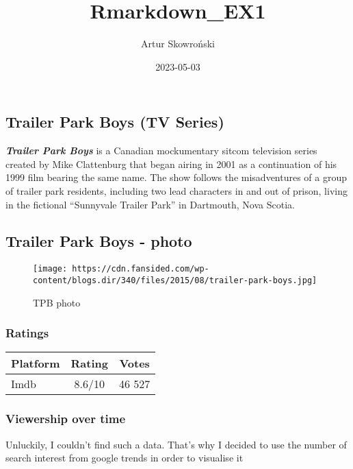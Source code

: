 \documentclass[
]{article}
\title{Rmarkdown\_EX1}
\author{Artur Skowroński}
\date{2023-05-03}
\begin{document}
\maketitle

\hypertarget{trailer-park-boys-tv-series}{%
\subsection{Trailer Park Boys (TV
Series)}\label{trailer-park-boys-tv-series}}

\textbf{\emph{Trailer Park Boys }} is a Canadian mockumentary sitcom
television series created by Mike Clattenburg that began airing in 2001
as a continuation of his 1999 film bearing the same name. The show
follows the misadventures of a group of trailer park residents,
including two lead characters in and out of prison, living in the
fictional ``Sunnyvale Trailer Park'' in Dartmouth, Nova Scotia.

\hypertarget{trailer-park-boys---photo}{%
\subsection{Trailer Park Boys - photo}\label{trailer-park-boys---photo}}

\begin{figure}
\centering
\texttt{[image: https://cdn.fansided.com/wp-content/blogs.dir/340/files/2015/08/trailer-park-boys.jpg]}
\caption{TPB photo}
\end{figure}

\hypertarget{ratings}{%
\subsubsection{Ratings}\label{ratings}}

\begin{longtable}[]{@{}lcc@{}}
\toprule()
Platform & Rating & Votes \\
\midrule()
\endhead
Imdb & 8.6/10 & 46 527 \\
\bottomrule()
\end{longtable}

\hypertarget{viewership-over-time}{%
\subsubsection{Viewership over time}\label{viewership-over-time}}

Unluckily, I couldn't find such a data. That's why I decided to use the
number of search interest from google trends in order to visualise it
\end{document}
